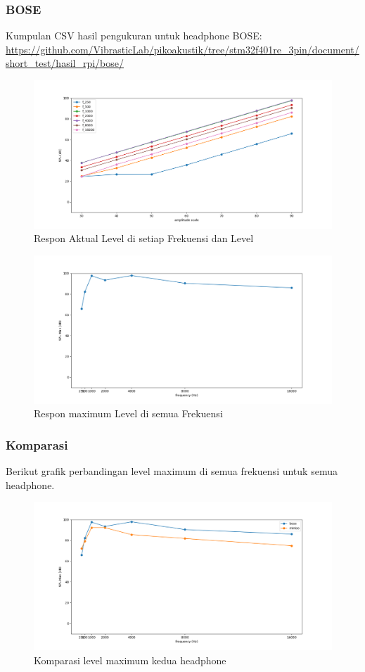 \documentclass[12pt,]{article}
\begin{document}
	\newpage
	\subsubsection{BOSE}
	Kumpulan CSV hasil pengukuran untuk headphone BOSE: \url{https://github.com/VibrasticLab/pikoakustik/tree/stm32f401re_3pin/document/short_test/hasil_rpi/bose/}
	
	\begin{figure}[!ht]
		\centering
		\includegraphics[width=450pt]{images/graph/bose_each}
		\caption{Respon Aktual Level di setiap Frekuensi dan Level}
	\end{figure}
	
	\begin{figure}[!ht]
		\centering
		\includegraphics[width=450pt]{images/graph/bose_allmax}
		\caption{Respon maximum Level di semua Frekuensi}
	\end{figure}

	\newpage
	\subsubsection{Komparasi}
	
	Berikut grafik perbandingan level maximum di semua frekuensi untuk semua headphone.
	
	\begin{figure}[!ht]
		\centering
		\includegraphics[width=450pt]{images/graph/all_allmax}
		\caption{Komparasi level maximum kedua headphone}
	\end{figure}
\end{document}
